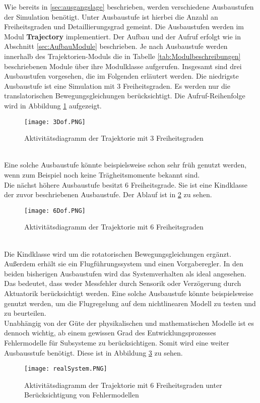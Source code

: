 Wie bereits in \ref{sec:ausgangslage} beschrieben, werden verschiedene Ausbaustufen der Simulation benötigt. Unter Ausbaustufe ist hierbei die Anzahl an Freiheitsgraden und Detaillierungsgrad gemeint. Die Ausbaustufen werden im Modul \textbf{Trajectory} implementiert. Der Aufbau und der Aufruf erfolgt wie in Abschnitt \ref{sec:AufbauModule} beschrieben. Je nach Ausbaustufe werden innerhalb des Trajektorien-Moduls die in Tabelle \ref{tab:Modulbeschreibungen}  beschriebenen Module über ihre Modulklasse aufgerufen.
Insgesamt sind drei Ausbaustufen vorgesehen, die im Folgenden erläutert werden.\newpage
Die niedrigste Ausbaustufe ist eine Simulation mit 3 Freiheitsgraden. Es werden nur die translatorischen Bewegungsgleichungen berücksichtigt. Die Aufruf-Reihenfolge wird in Abbildung \ref{fig:3_Dof} aufgezeigt.
\begin{figure}[h]
	\centering\texttt{[image: 3Dof.PNG]}
	\label{fig:3_Dof}
	\caption{Aktivitätsdiagramm der Trajektorie mit 3 Freiheitsgraden}
\end{figure}\\
Eine solche Ausbaustufe könnte beispielsweise schon sehr früh genutzt werden, wenn zum Beispiel noch keine Trägheitsmomente bekannt sind. \\
Die nächst höhere Ausbaustufe besitzt 6 Freiheitsgrade. Sie ist eine Kindklasse der zuvor beschriebenen Ausbaustufe. Der Ablauf ist in \ref{fig:6Dof} zu sehen. 
\begin{figure}[h]
	\texttt{[image: 6Dof.PNG]}
	\label{fig:6Dof}
	\caption{Aktivitätsdiagramm der Trajektorie mit 6 Freiheitsgraden}
\end{figure}\\
Die Kindklasse wird um die rotatorischen Bewegungsgleichungen ergänzt. Außerdem erhält sie ein Flugführungssystem und einen Vorgaberegler. In den beiden bisherigen Ausbaustufen wird das Systemverhalten als ideal angesehen. Das bedeutet, dass weder Messfehler durch Sensorik oder Verzögerung durch Aktuatorik berücksichtigt werden. Eine solche Ausbaustufe könnte beispielsweise genutzt werden, um die Flugregelung auf dem nichtlinearen Modell zu testen und zu beurteilen. \\
Unabhängig von der Güte der physikalischen und mathematischen Modelle ist es dennoch wichtig, ab einem gewissen Grad des Entwicklungsprozesses Fehlermodelle für Subsysteme zu berücksichtigen. Somit wird eine weiter Ausbausstufe benötigt. Diese ist in Abbildung \ref{fig:realSys} zu sehen.
\begin{figure}[h]
	\texttt{[image: realSystem.PNG]}
	\label{fig:realSys}
	\caption{Aktivitätsdiagramm der Trajektorie mit 6 Freiheitsgraden unter Berücksichtigung von Fehlermodellen}
\end{figure}\\
